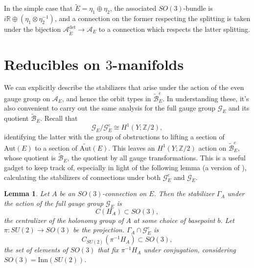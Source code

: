 \documentclass{memo-l}
\newtheorem{lemma}[theorem]{Lemma}
\theoremstyle{definition}
\theoremstyle{remark}
\numberwithin{section}{chapter}
\numberwithin{equation}{chapter}
\begin{document}
In the simple case that $\tilde E = \eta_1 \oplus \eta_2$, the associated $SO(3)$-bundle is $i\mathbb R \oplus (\eta_1 \otimes \eta_2^{-1})$, and a connection on the former respecting the splitting is taken under the bijection $\mathcal A_{\tilde E}^{\text{det}} \to \mathcal A_E$ to a connection which respects the latter splitting.

\section{Reducibles on $3$-manifolds}\label{sec:config-red-3d}
We can explicitly describe the stabilizers that arise under the action of the even gauge group on $\mathcal A_E$, and hence the orbit types in $\widetilde{\mathcal B}^e_E$. In understanding these, it's also convenient to carry out the same analysis for the full gauge group $\mathcal G_E$ and its quotient $\widetilde{\mathcal B}_E$. Recall that $$\mathcal G_E/\mathcal G^e_E \cong H^1(Y;\mathbb Z/2),$$ identifying the latter with the group of obstructions to lifting a section of $\text{Aut}(E)$ to a section of $\widetilde{\text{Aut}}(E)$. This leaves an $H^1(Y;\mathbb Z/2)$ action on $\widetilde{\mathcal B}^e_E$, whose quotient is $\widetilde{\mathcal B}_E$, the quotient by all gauge transformations. This is a useful gadget to keep track of, especially in light of the following lemma (a version of \cite[Lemma~4.28]{DK}), calculating the stabilizers of connections under both $\mathcal G^e_E$ and $\mathcal G_E$.

\begin{lemma}\label{stab1}Let $A$ be an $SO(3)$-connection on $E$. Then the stabilizer $\Gamma_A$ under the action of the full gauge group $\mathcal G_E$ is $$C(H_A) \subset SO(3),$$ the centralizer of the holonomy group of $A$ at some choice of basepoint $b$. Let $\pi: SU(2) \to SO(3)$ be the projection. $\Gamma_A \cap \mathcal G^e_E$ is $$C_{SU(2)}(\pi^{-1}H_A) \subset SO(3),$$ the set of elements of $SO(3)$ that fix $\pi^{-1}H_A$ under conjugation, considering $SO(3) = \text{Inn}(SU(2))$.
\end{lemma}
\end{document}
